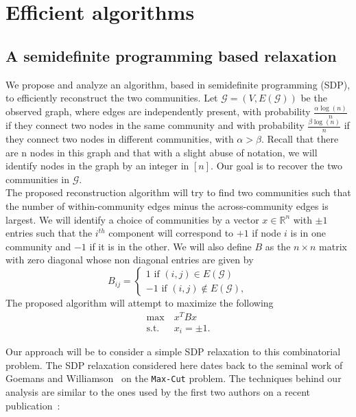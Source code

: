 \documentclass[english]{article}
\newcommand{\1}{\textbf{1}}
\newcommand{\G}{\mathcal{G}}
\begin{document}
\section{Efficient algorithms}

\subsection{A semidefinite programming based relaxation}




We propose and analyze an algorithm, based in semidefinite programming (SDP), to efficiently reconstruct the two communities. Let $\G=(V,E(\G))$ be the observed graph, where edges are independently present, with probability $\frac{\alpha \log(n)}{n}$ if they connect two nodes in the same community and with probability $\frac{\beta \log(n)}{n}$ if they connect two nodes in different communities, with $\alpha>\beta$. Recall that there are n nodes in this graph and that with a slight abuse of notation, we will identify nodes in the graph by an integer in $[n]$. Our goal is to recover the two communities in $\G$.\\

The proposed reconstruction algorithm will try to find two communities such that the number of within-community edges minus the across-community edges is largest. We will identify a choice of communities by a vector $x\in\mathbb{R}^n$ with $\pm1$ entries such that the $i^{th}$ component will correspond to $+1$ if node $i$ is in one community and $-1$ if it is in the other. We will also define $B$ as the $n\times n$ matrix with zero diagonal whose non diagonal entries are given by
\[
B_{ij} = \left\{ \begin{array}{l} 1 \text{ if } (i,j)\in E(\G) \\  -1 \text{ if } (i,j)\notin E(\G), \end{array}  \right.
\] 
The proposed algorithm will attempt to maximize the following
\begin{align}
\max\ &x^TBx\\
\text{s.t.}\ &x_i=\pm1.
\end{align}

Our approach will be to consider a simple SDP relaxation to this combinatorial problem. The SDP relaxation considered here dates back to the seminal work of Goemans and Williamson~\cite{MXGoemans_DPWilliamson_1995} on the \texttt{Max-Cut} problem. The techniques behind our analysis are similar to the ones used by the first two authors on a recent publication~\cite{Abbe_Z2SynchJournal,Abbe_Z2SynchER}:
\end{document}
